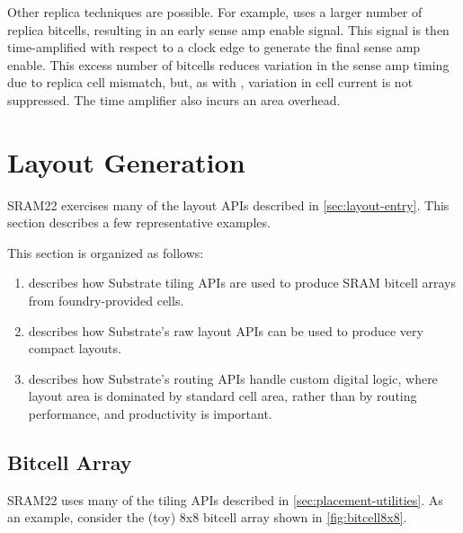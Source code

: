 Other replica techniques are possible. For example, \cite{niki} uses a larger number of replica bitcells,
resulting in an early sense amp enable signal. This signal is then time-amplified with respect to a clock edge
to generate the final sense amp enable. This excess number of bitcells reduces variation in the sense amp timing
due to replica cell mismatch, but, as with \cite{replicabl}, variation in cell current is not suppressed.
The time amplifier also incurs an area overhead.


\section{Layout Generation} \label{sec:sram-layout-generation}

SRAM22 exercises many of the layout APIs described in \ref{sec:layout-entry}.
This section describes a few representative examples.

This section is organized as follows:
\begin{enumerate}
\item {} describes how Substrate tiling APIs are used to produce SRAM bitcell arrays from foundry-provided cells.
\item {} describes how Substrate's raw layout APIs can be used to produce very compact layouts.
\item {} describes how Substrate's routing APIs handle custom digital logic, where layout area is dominated
  by standard cell area, rather than by routing performance, and productivity is important.
\end{enumerate}


\subsection{Bitcell Array} \label{sec:bitcell-array-layout}

SRAM22 uses many of the tiling APIs described in \ref{sec:placement-utilities}.
As an example, consider the (toy) 8x8 bitcell array shown in \ref{fig:bitcell8x8}.

